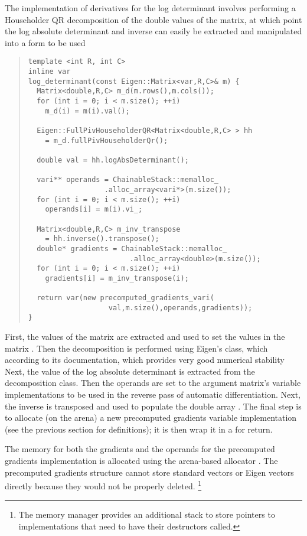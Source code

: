 \documentclass[10pt]{article}
\begin{document}
The implementation of derivatives for the log determinant involves
performing a Householder QR decomposition of the double values of the
matrix, at which point the log absolute determinant and inverse can
easily be extracted and manipulated into a form to be used

\begin{quote}
\begin{Verbatim}
template <int R, int C>
inline var 
log_determinant(const Eigen::Matrix<var,R,C>& m) {
  Matrix<double,R,C> m_d(m.rows(),m.cols());
  for (int i = 0; i < m.size(); ++i)
    m_d(i) = m(i).val();

  Eigen::FullPivHouseholderQR<Matrix<double,R,C> > hh
    = m_d.fullPivHouseholderQr();

  double val = hh.logAbsDeterminant();

  vari** operands = ChainableStack::memalloc_
                  .alloc_array<vari*>(m.size());
  for (int i = 0; i < m.size(); ++i)
    operands[i] = m(i).vi_;

  Matrix<double,R,C> m_inv_transpose 
    = hh.inverse().transpose();
  double* gradients = ChainableStack::memalloc_
                        .alloc_array<double>(m.size());
  for (int i = 0; i < m.size(); ++i)
    gradients[i] = m_inv_transpose(i);

  return var(new precomputed_gradients_vari(
                   val,m.size(),operands,gradients));
}
\end{Verbatim}
\end{quote}
%
First, the values of the  matrix are extracted and used to
set the values in the  matrix .  Then the
decomposition is performed using Eigen's 
class, which according to its documentation, which provides very good
numerical stability \citep[Section~5.1]{GolubVanLoan:96} Next, the value
of the log absolute determinant is extracted from the decomposition
class.  Then the operands are set to the argument matrix's variable
implementations to be used in the reverse pass of automatic
differentiation.  Next, the inverse is transposed and used to populate
the double array .  The final step is to allocate (on
the arena) a new precomputed gradients variable implementation (see
the previous section for definitions); it is then wrap it in a
 for return.
 
The memory for both the gradients and the operands for the precomputed
gradients implementation is allocated using the arena-based allocator
.  The precomputed gradients structure cannot store
standard vectors or Eigen vectors directly because they would not be
properly deleted.%
%
\footnote{The  memory manager provides an additional
  stack to store pointers to  implementations that
  need to have their destructors called.}
\end{document}
